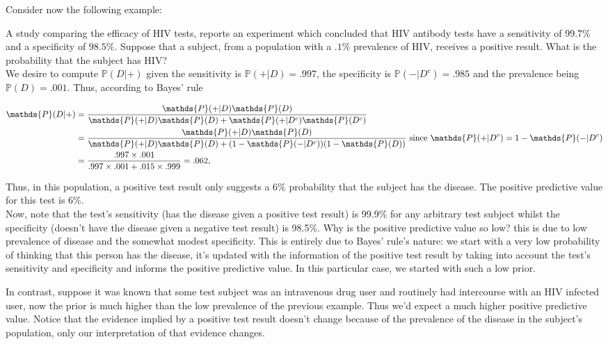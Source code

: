 \documentclass{homework}
\begin{document}
Consider now the following example:

\begin{tcolorbox}[title = Diagnostic test example]

A study comparing the efficacy of HIV tests, reports an experiment which concluded that HIV antibody tests have a sensitivity of $99.7\%$ and a specificity of $98.5\%$. Suppose that a subject, from a population with a $.1\%$ prevalence of HIV, receives a positive result. What is the probability that the subject has HIV? \\

We desire to compute $\mathds{P}(D|+)$ given the sensitivity is $\mathds{P}(+|D)=.997$, the specificity is $\mathds{P}(-|D^c)=.985$ and the prevalence being $\mathds{P}(D) = .001$. Thus, according to Bayes' rule

\begin{align*}
    \mathds{P}(D|+) &= \frac{\mathds{P}(+|D)\mathds{P}(D)}{\mathds{P}(+|D)\mathds{P}(D)+\mathds{P}(+|D^c)\mathds{P}(D^c)} \\
    &= \frac{\mathds{P}(+|D)\mathds{P}(D)}{\mathds{P}(+|D)\mathds{P}(D)+(1-\mathds{P}(-|D^c))(1-\mathds{P}(D))} \textnormal{ since } \mathds{P}(+|D^c) = 1-\mathds{P}(-|D^c) \\
    &= \frac{.997 \times .001}{.997 \times .001 + .015 \times .999} = .062,
\end{align*}

Thus, in this population, a positive test result only suggests a 6\% probability that the subject has the disease. The positive predictive value for this test is 6\%. \\

Now, note that the test's sensitivity (has the disease given a positive test result) is 99.9\% for any arbitrary test subject whilst the specificity (doesn't have the disease given a negative test result) is 98.5\%. Why is the positive predictive value so low? this is due to low prevalence of disease and the somewhat modest specificity. This is entirely due to Bayes' rule's nature: we start with a very low probability of thinking that this person has the disease, it's updated with the information of the positive test result by taking into account the test's sensitivity and specificity and informs the positive predictive value. In this particular case, we started with such a low prior.

In contrast, suppose it was known that some test subject was an intravenous drug user and routinely had intercourse with an HIV infected user, now the prior is much higher than the low prevalence of the previous example. Thus we'd expect a much higher positive predictive value. 
Notice that the evidence implied by a positive test result doesn't change because of the prevalence of the disease in the subject's population, only our interpretation of that evidence changes.  \end{tcolorbox} 
\end{document}
